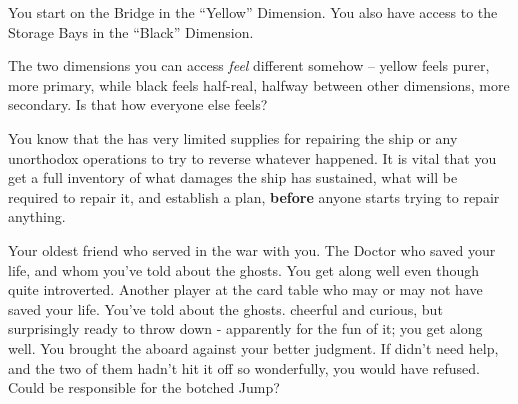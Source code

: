 \documentclass[char]{TMFHope}
\begin{document}
\begin{itemz}[Notes]
	\item You start on the Bridge in the ``Yellow'' Dimension. You also have access to the Storage Bays in the ``Black'' Dimension. 
	\item The two dimensions you can access {\em feel} different somehow -- yellow feels purer, more primary, while black feels half-real, halfway between other dimensions, more secondary.  Is that how everyone else feels?
	\item You know that the \pNew{} has very limited supplies for repairing the ship or any unorthodox operations to try to reverse whatever happened. It is vital that you get a full inventory of what damages the ship has sustained, what will be required to repair it, and establish a plan, {\bf before} anyone starts trying to repair anything.
\end{itemz}

\begin{contacts}
	\contact{\cXO{}} Your oldest friend who served in the war with you.
	\contact{\cMed{}} The Doctor who saved your life, and whom you've told about the ghosts. You get along well even though \cMed{\they} \cMed{\are} quite introverted.
	\contact{\cSci{}} Another player at the card table who may or may not have saved your life. You've told \cSci{\them} about the ghosts. \cSci{\They} \cSci{\are} cheerful and curious, but surprisingly ready to throw down - apparently for the fun of it; you get along well.
	\contact{\cBoy{}} You brought the \cBoy{\kid} aboard against your better judgment. If \cEng{} didn't need help, and the two of them hadn't hit it off so wonderfully, you would have refused. Could \cBoy{} be responsible for the botched Jump?
\end{contacts}
\end{document}

